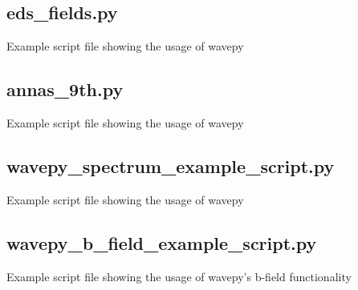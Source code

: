 \documentclass[
12pt,%
a4paper,  %
twoside        %
]{report}
\begin{document}
\begin{landscape}
\subsection{eds\_fields.py}
Example script file showing the usage of wavepy
\subsection{annas\_9th.py}
Example script file showing the usage of wavepy
\subsection{wavepy\_spectrum\_example\_script.py}
Example script file showing the usage of wavepy
\subsection{wavepy\_b\_field\_example\_script.py}
Example script file showing the usage of wavepy's b-field functionality
\end{landscape}
\end{document}
